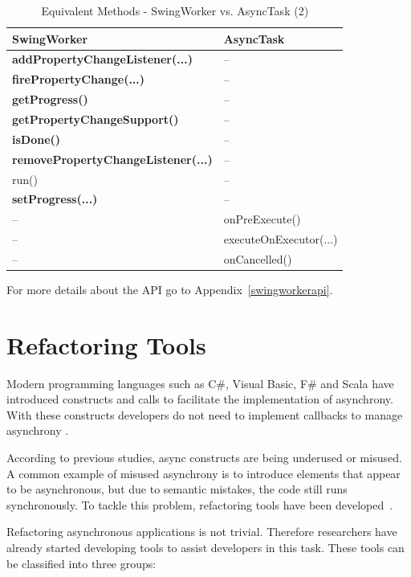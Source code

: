 \documentclass[type=bsc,accentcolor=tud9c]{tudthesis}
\newcommand{\framework}[1]{\textcolor{black!65}{#1}}
\begin{document}
\begin{table}[h]
{\small
\begin{center}
\begin{tabular}{|C{6cm} | C{6cm}|}
\hline
\bf SwingWorker~\cite{swingworkerapi} & \bf AsyncTask~\cite{ulrAndroidAsyncTask}\\\hline
\bf addPropertyChangeListener(...) & --\\
\bf firePropertyChange(...) & --\\
\bf getProgress() & --\\
\bf getPropertyChangeSupport() & --\\
\bf isDone() & --\\
\bf removePropertyChangeListener(...)& --\\
run()& --\\
\bf setProgress(...)& --\\\hline
-- & onPreExecute() \\
-- & executeOnExecutor(...)\\
-- & onCancelled()\\\hline
\end{tabular}
\end{center}
\caption{Equivalent Methods - SwingWorker vs. AsyncTask (2)}
\label{table:worker-task-non-equivalent}
}
\end{table}

For more details about the  API go to Appendix~\ref{swingworkerapi}. 

\section{Refactoring Tools}
\label{sec:refactoring-tools}
Modern programming languages such as \framework{C\#}, \framework{Visual Basic}, \framework{F\#} and \framework{Scala} have introduced  constructs and  calls to facilitate the implementation of asynchrony. With these constructs developers do not need to implement callbacks to manage asynchrony \cite{paperAsyncMobile}. 

According to previous studies, async constructs are being underused or misused. A common example of misused asynchrony is to introduce elements that appear to be asynchronous, but due to semantic mistakes, the code still runs synchronously. To tackle this problem, refactoring tools have been developed~\cite{paperAsyncMobile}. 

Refactoring asynchronous applications is not trivial. Therefore researchers have already started developing tools to assist developers in this task. These tools can be classified into three groups:
\end{document}
